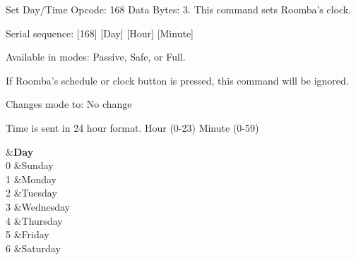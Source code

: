 \begin{Desc}
\begin{description}
\begin{DoxyItemize}
\end{DoxyItemize}\item[{\em 
\hypertarget{group__roomba-lib_gga305e17dfb7050ad83ea49ded2e6a2e24a17519d3bc7b9e8c70af28afe85d92229}{}R\+O\+O\+M\+B\+A\+\_\+\+S\+E\+T\+\_\+\+D\+A\+Y\+\_\+\+T\+I\+M\+E\label{group__roomba-lib_gga305e17dfb7050ad83ea49ded2e6a2e24a17519d3bc7b9e8c70af28afe85d92229}
}]Set Day/\+Time Opcode\+: 168 Data Bytes\+: 3. This command sets Roomba’s clock.
\begin{DoxyItemize}
\item Serial sequence\+: \mbox{[}168\mbox{]} \mbox{[}Day\mbox{]} \mbox{[}Hour\mbox{]} \mbox{[}Minute\mbox{]}
\item Available in modes\+: Passive, Safe, or Full.
\item If Roomba’s schedule or clock button is pressed, this command will be ignored.
\item Changes mode to\+: No change
\item Time is sent in 24 hour format. Hour (0-\/23) Minute (0-\/59) \begin{TabularC}{2}
\hline
{}&{\bf Day  }\\
0 &Sunday \\
1 &Monday \\
2 &Tuesday \\
3 &Wednesday \\
4 &Thursday \\
5 &Friday \\
6 &Saturday \\
\end{TabularC}


\end{DoxyItemize}
\end{description}
\end{Desc}
